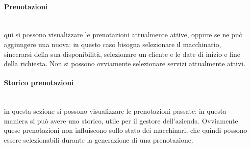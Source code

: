 \paragraph{Prenotazioni}
~\\qui si possono visualizzare le prenotazioni attualmente attive, oppure se ne può aggiungere una nuova: in questo caso bisogna selezionare il macchinario, sincerarsi della sua disponibilità, selezionare un cliente e le date di inizio e fine della richiesta. Non si possono ovviamente selezionare servizi attualmente attivi.
\paragraph{Storico prenotazioni}
~\\in questa sezione si possono visualizzare le prenotazioni passate: in questa maniera si può avere uno storico, utile per il gestore dell'azienda. Ovviamente quese prenotazioni non influiscono sullo stato dei macchinari, che quindi possono essere selezionabili durante la generazione di una prenotazione.











